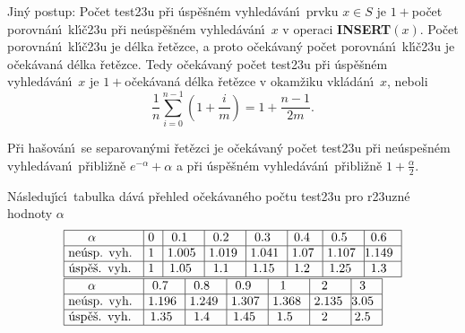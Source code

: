 \flushpar Jin\'y postup: Po\v cet test\accent23u p\v ri \'usp\v e\v sn\'em 
vyhled\'av\'an\'\i\ prvku $x\in S$ je $1+$po\v cet porovn\'an\'\i\ 
kl\'\i\v c\accent23u p\v ri ne\'usp\v e\v sn\'em vyhled\'av\'an\'\i\ $
x$ v operaci 
{\bf INSERT$(x)$}. Po\v cet porovn\'an\'\i\ kl\'\i\v c\accent23u je d\'elka 
\v ret\v ezce, a proto o\v cek\'ava\-n\'y po\v cet porovn\'an\'\i\ kl\'\i\v c\accent23u 
je o\v cek\'ava\-n\'a d\'elka \v ret\v ezce. Tedy o\v cek\'avan\'y po\v cet 
test\accent23u p\v ri \'usp\v e\v sn\'em vyhled\'av\'an\'\i\ $x$ je  
$1+$o\v cek\'avan\'a d\'elka \v ret\v ezce v okam\v ziku vkl\'ad\'an\'\i\ $
x$, neboli 
$$\frac 1n\sum_{i=0}^{n-1}(1+\frac im)=1+\frac {n-1}{2m}.$$

P\v ri ha\v sov\'an\'\i\ se separovan\'ymi \v ret\v ezci je 
o\v cek\'avan\'y po\-\v cet test\accent23u p\v ri ne\'uspe\v s\-n\'em 
vyhled\'avan\'\i\ p\v ribli\v zn\v e $e^{-\alpha}+\alpha$ a p\v ri \'us\-p\v e\v s\-n\'em 
vyhled\'av\'an\'\i\ p\v ribli\v zn\v e $1+\frac {\alpha}2$.
\endproclaim

\flushpar N\'asleduj\'\i c\'\i\ tabulka d\'av\'a p\v rehled o\v cek\'avan\'eho 
po\v ctu test\accent23u pro r\accent23uzn\'e hodnoty $\alpha$
$$\vtop{\hbox{\vbox {\offinterlineskip\halign{\strut\vrule\ # & \vrule\ # & \vrule\ # & \vrule\ # & \vrule\ # & \vrule\ # & \vrule\ # & \vrule\hfill # \hfill \vrule\cr\noalign{\hrule} $
\alpha$ & 0 & 0.1 & 0.2 & 0.3 & 0.4 & 0.5 & 0.6 \cr\noalign{\hrule}ne\'usp. vyh. & 1 & 1.005 & 1.019 & 1.041 & 1.07 & 1.107 & 1.149 \cr\noalign{\hrule} \'usp\v e\v s. vyh. & 1 & 1.05 & 1.1 & 1.15 & 1.2 & 1.25 & 1.3 \cr\noalign{\hrule}}}}\hbox{\vbox {\offinterlineskip\halign{\strut\vrule\ # & \vrule\ # & \vrule\ # & \vrule\ # & \vrule\ # & \vrule\ # & \vrule\hfill # \hfill \vrule\cr\noalign{\hrule} $
\alpha$ & 0.7 & 0.8 & 0.9 & 1 & 2 & 3 \cr\noalign{\hrule}ne\'usp. vyh. & 1.196 & 1.249 & 1.307 & 1.368 & 2.135 & 3.05 \cr\noalign{\hrule}\'usp\v e\v s. vyh. & 1.35 & 1.4 & 1.45 & 1.5 & 2 & 2.5 \cr\noalign{\hrule}}}}}$$

